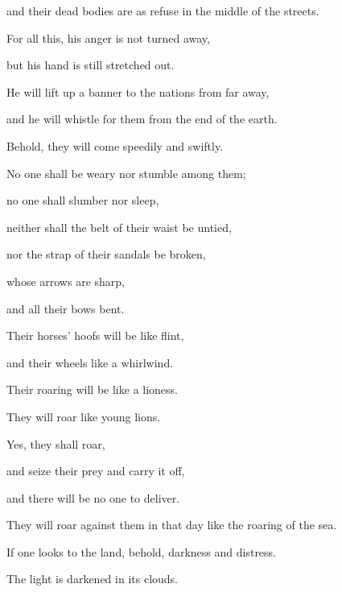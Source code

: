 {\par }{\QB and their dead bodies are as refuse in the middle of the streets.
\par }{\Q For all this, his anger is not turned away,
\par }{\QB but his hand is still stretched out.
\par }{\BB \par }{\Q {}He will lift up a banner to the nations from far away,
\par }{\QB and he will whistle for them from the end of the earth.
\par }{\QB Behold, they will come speedily and swiftly.
\par }{\Q {}No one shall be weary nor stumble among them;
\par }{\QB no one shall slumber nor sleep,
\par }{\QB neither shall the belt of their waist be untied,
\par }{\QB nor the strap of their sandals be broken,
\par }{\Q {}whose arrows are sharp,
\par }{\QB and all their bows bent.
\par }{\Q Their horses’ hoofs will be like flint,
\par }{\QB and their wheels like a whirlwind.
\par }{\Q {}Their roaring will be like a lioness.
\par }{\QB They will roar like young lions.
\par }{\Q Yes, they shall roar,
\par }{\QB and seize their prey and carry it off,
\par }{\QB and there will be no one to deliver.
\par }{\Q {}They will roar against them in that day like the roaring of the sea.
\par }{\QB If one looks to the land, behold, darkness and distress.
\par }{\QB The light is darkened in its clouds.

}
